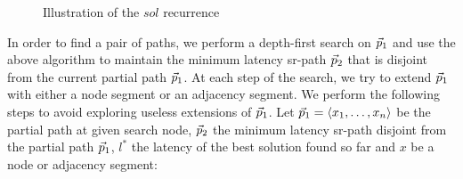  \begin{figure}
 \begin{center}
 \end{center}
 \caption{Illustration of the $\mathit{sol}$ recurrence}
 \label{fig:dp_disjoint}
 \end{figure}

In order to find a pair of paths, we perform a depth-first search on $\vec{p}_1$ and use
the above algorithm to maintain the minimum latency sr-path $\vec{p}_2$ that is disjoint from the 
current partial path $\vec{p}_1$. At each step of the search, we try to extend $\vec{p}_1$
with either a node segment or an adjacency segment. We perform the following steps to
avoid exploring useless extensions of $\vec{p}_1$. Let $\vec{p}_1 = \langle
x_1, \ldots, x_n \rangle$ be the partial path at given search node, $\vec{p}_2$
the minimum latency sr-path disjoint from the partial path $\vec{p}_1$, $l^*$ the 
latency of the best solution found so far and $x$ be a node or adjacency segment:

